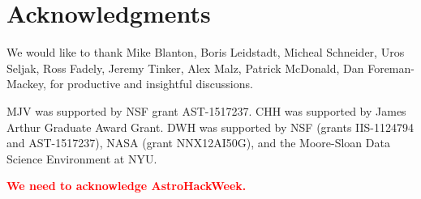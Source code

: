 \documentclass[12pt, preprint]{aastex}
\newcommand{\todo}[1]{{\bf \textcolor{red}{ #1}}}
\begin{document}
\section*{Acknowledgments}

We would like to thank Mike Blanton, Boris Leidstadt, Micheal Schneider, 
Uros Seljak, Ross Fadely, Jeremy Tinker, Alex Malz, Patrick McDonald, Dan 
Foreman-Mackey, for productive and insightful discussions. 

MJV was supported by NSF grant AST-1517237. CHH was supported by James 
Arthur Graduate Award Grant. DWH was supported by NSF (grants IIS-1124794 
and AST-1517237), NASA (grant NNX12AI50G), and the Moore-Sloan Data Science 
Environment at NYU.

\todo{We need to acknowledge AstroHackWeek.}



\end{document}
